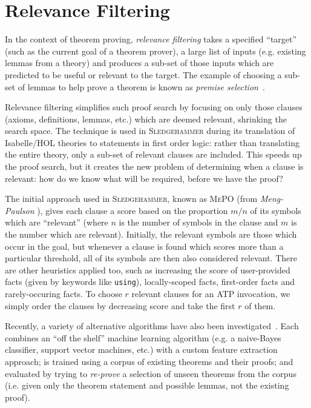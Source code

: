 \section{Relevance Filtering}
\label{sec:relevance}

In the context of theorem proving, \emph{relevance filtering} takes a specified
``target'' (such as the current goal of a theorem prover), a large list of
inputs (e.g. existing lemmas from a theory) and produces a sub-set of those
inputs which are predicted to be useful or relevant to the target. The example
of choosing a sub-set of lemmas to help prove a theorem is known as
\emph{premise selection}~\cite{kuhlwein2012overview}.

Relevance filtering simplifies such proof search by focusing on only those
clauses (axioms, definitions, lemmas, etc.) which are deemed relevant, shrinking
the search space. The technique is used in \textsc{Sledgehammer} during its
translation of Isabelle/HOL theories to statements in first order logic: rather
than translating the entire theory, only a sub-set of relevant clauses are
included. This speeds up the proof search, but it creates the new problem of
determining when a clause is relevant: how do we know what will be required,
before we have the proof?

The initial approach used in \textsc{Sledgehammer}, known as \textsc{MePO} (from
\emph{Meng-Paulson} \cite{meng2009lightweight}), gives each clause a score based
on the proportion $m / n$ of its symbols which are ``relevant'' (where $n$ is
the number of symbols in the clause and $m$ is the number which are relevant).
Initially, the relevant symbols are those which occur in the goal, but whenever
a clause is found which scores more than a particular threshold, all of its
symbols are then also considered relevant. There are other heuristics applied
too, such as increasing the score of user-provided facts (given by keywords
like \texttt{using}), locally-scoped facts, first-order facts and
rarely-occuring facts. To choose $r$ relevant clauses for an ATP invocation, we
simply order the clauses by decreasing score and take the first $r$ of them.

Recently, a variety of alternative algorithms have also been
investigated~\cite{kuhlwein2013mash,hoder2011sine,urban2013blistr,gauthier2015premise,alama2014premise,carlson1999snow,kaliszyk2014machinelearner,kaliszyk2015femalecop}.
Each combines an ``off the shelf'' machine learning algorithm (e.g. a
naive-Bayes classifier, support vector machines, etc.) with a custom feature
extraction approach; is trained using a corpus of existing theorems and their
proofs; and evaluated by trying to \emph{re-prove} a selection of unseen
theorems from the corpus (i.e. given only the theorem statement and possible
lemmas, not the existing proof).

